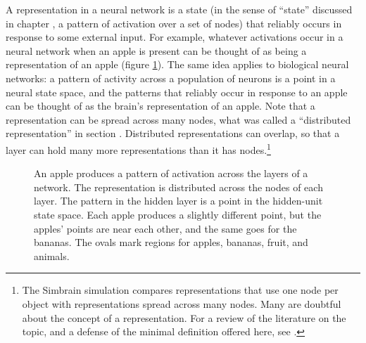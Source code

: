 
A representation in a neural network is a state (in the sense of ``state'' discussed in chapter ,  a pattern of activation over a set of nodes) that reliably occurs in response to some external input. For example, whatever activations occur in a neural network when an apple is present can be thought of as being a representation of an apple (figure \ref{repStateSpace}). The same idea applies to biological neural networks: a pattern of activity across a population of neurons is a point in a neural state space, and the patterns that reliably occur in response to an apple can be thought of as the brain's representation of an apple. Note that a representation can be spread across many nodes, what was called a ``distributed representation'' in section . Distributed representations can overlap, so that a layer can hold many more representations than it has nodes.\footnote{The Simbrain simulation  compares representations that use one node per object with representations spread across many nodes. Many are doubtful about the concept of a representation. For a review of the literature on the topic, and a defense of the minimal definition offered here, see \cite{hotton2024open}.}

\begin{figure}[htbp]
\centering
{}
\caption[Jeff Yoshimi.]{An apple produces a pattern of activation across the layers of a network. The representation is distributed across the nodes of each layer. The pattern in the hidden layer is a point in the hidden-unit state space. Each apple produces a slightly different point, but the apples' points are near each other, and the same goes for the bananas. The ovals mark regions for apples, bananas, fruit, and animals.}
\label{repStateSpace}
\end{figure}

